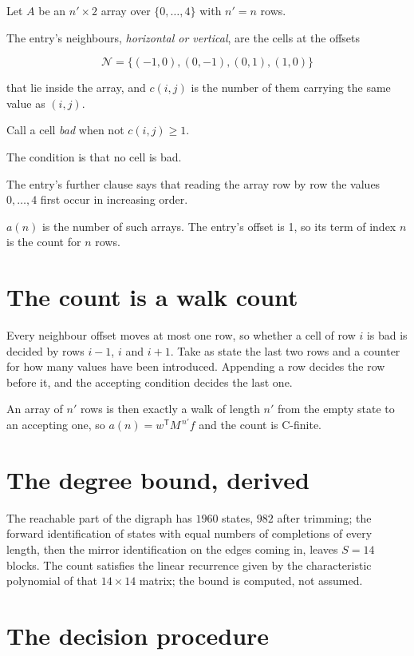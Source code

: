 \documentclass[11pt]{article}
\theoremstyle{definition}
\begin{document}
Let $A$ be an $n' \times 2$ array over $\{0,\dots,4\}$ with $n' = n$ rows.

The entry's neighbours, {\itshape horizontal or vertical}, are the cells at the offsets

\[\mathcal{N} = \{(-1,0), (0,-1), (0,1), (1,0)\}\]

that lie inside the array, and $c(i,j)$ is the number of them carrying the same value as $(i,j)$.

Call a cell {\itshape bad} when not $c(i,j) \ge 1$.

The condition is that no cell is bad.

The entry's further clause says that reading the array row by row the values $0,\dots,4$ first occur in increasing order.

$a(n)$ is the number of such arrays. The entry's offset is 1, so its term of index $n$ is the count for $n$ rows.

\section{The count is a walk count}

Every neighbour offset moves at most one row, so whether a cell of row $i$ is bad is decided by rows $i-1$, $i$ and $i+1$. Take as state the last two rows and a counter for how many values have been introduced. Appending a row decides the row before it, and the accepting condition decides the last one.

An array of $n'$ rows is then exactly a walk of length $n'$ from the empty state to an accepting one, so $a(n) = w^{\mathsf T}M^{\,n'}f$ and the count is C-finite.

\section{The degree bound, derived}

The reachable part of the digraph has $1960$ states, $982$ after trimming; the forward identification of states with equal numbers of completions of every length, then the mirror identification on the edges coming in, leaves $S = 14$ blocks. The count satisfies the linear recurrence given by the characteristic polynomial of that $14\times14$ matrix; the bound is computed, not assumed.

\section{The decision procedure}
\end{document}
